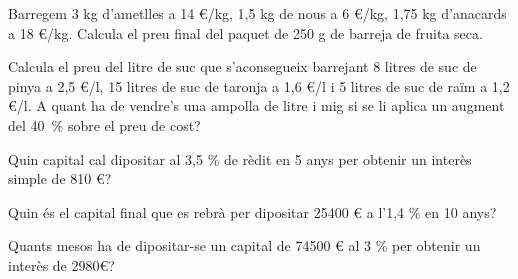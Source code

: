 \begin{activitats}
\begin{mylist}
\exer
  Barregem 3 kg d'ametlles a 14 \euro{}/kg, 1,5 kg de nous a 6
  \euro{}/kg, 1,75 kg d'anacards a 18 \euro{}/kg. Calcula el preu final
  del paquet de 250 g de barreja de fruita seca.

   
\exer
  Calcula el preu del litre de suc que s'aconsegueix barrejant 8 litres
  de suc de pinya a 2,5 \euro{}/l, 15 litres de suc de taronja a 1,6
  \euro{}/l i 5 litres de suc de raïm a 1,2 \euro{}/l. A quant ha de
  vendre's una ampolla de litre i mig si se li aplica un augment del
  40~\% sobre el preu de cost?



\pagebreak

\exer
  Quin capital cal dipositar al 3,5 \% de rèdit en 5 anys per obtenir un
  interès simple de 810 \euro{}?



\exer
  Quin és el capital final que es rebrà per dipositar 25400 \euro{} a
  l'1,4 \% en 10 anys?

\answers{28956 \euro{}}

\exer
  Quants mesos ha de dipositar-se un capital de 74500 \euro{} al 3 \%
  per obtenir un interès de 2980\euro{}?
 


\end{mylist}
\end{activitats}



